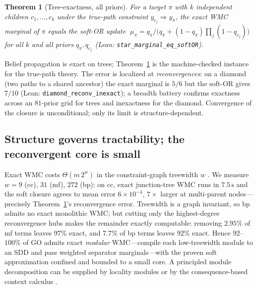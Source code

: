 \documentclass[11pt]{article}
\newtheorem{theorem}{Theorem}
\begin{document}
\begin{theorem}[Tree-exactness, all priors]\label{thm:star}
For a target $\pi$ with $k$ independent children $c_1,\dots,c_k$ under the true-path constraint
$y_{c_j}\!\Rightarrow\!y_\pi$, the exact WMC marginal of $\pi$ equals the soft-OR update
$\;\mu_\pi = q_\pi\big/\big(q_\pi+(1-q_\pi)\textstyle\prod_{j}(1-q_{c_j})\big)\;$
for all $k$ and all priors $q_\pi,q_{c_j}$ (Lean: \texttt{star\_marginal\_eq\_softOR}).
\end{theorem}
Belief propagation \citep{pearl1988probabilistic} is exact on trees; Theorem~\ref{thm:star} is the
machine-checked instance for the true-path theory. The error is localized at \emph{reconvergences}:
on a diamond (two paths to a shared ancestor) the exact marginal is $5/6$ but the soft-OR gives
$7/10$ (Lean: \texttt{diamond\_reconv\_inexact}); a breadth battery confirms exactness across an
$81$-prior grid for trees and inexactness for the diamond. Convergence of the closure is
unconditional; only its limit is structure-dependent.

\subsection{Structure governs tractability; the reconvergent core is small}\label{sec:scaling}
Exact WMC costs $\Theta(m\,2^{w})$ in the constraint-graph treewidth $w$
\citep{darwiche2011sdd,bodlaender1993treewidth}. We measure $w=9$ (cc), $31$ (mf), $272$ (bp): on
cc, exact junction-tree WMC runs in $7.5$\,s and the soft closure agrees to mean error
$6\times10^{-4}$, $7\times$ larger at multi-parent nodes---precisely Theorem~\ref{thm:star}'s
reconvergence error. Treewidth is a graph invariant, so bp admits no exact monolithic WMC; but
cutting only the highest-degree reconvergence hubs makes the remainder exactly computable:
removing $2.95\%$ of mf terms leaves $97\%$ exact, and $7.7\%$ of bp terms leaves $92\%$ exact.
Hence $92$--$100\%$ of GO admits exact \emph{modular} WMC---compile each low-treewidth module to an
SDD and pass weighted separator marginals---with the proven soft approximation confined and
bounded to a small core. A principled module decomposition can be supplied by locality modules
\citep{cuencagrau2008modular} or by the consequence-based context calculus
\citep{bate2016sriq,tenacucala2019sequoia}.
\end{document}

